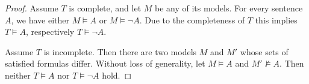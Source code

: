 

\setcounter{section}{3}
\setcounter{subsection}{1}
\setcounter{dfn}{12}

\begin{proof}
Assume $T$ is complete, and let $M$ be any of its models.
For every sentence $A$, we have either $M \vDash A$ or $M \vDash \neg A$.
Due to the completeness of $T$ this implies $T \vDash A$, respectively $T \vDash \neg A$.

Assume $T$ is incomplete. Then there are two models $M$ and $M'$ whose sets of satisfied formulas differ.
Without loss of generality, let $M \vDash A$ and $M' \not\vDash A$.
Then neither $T \vDash A$ nor $T \vDash \neg A$ hold.
\end{proof}


